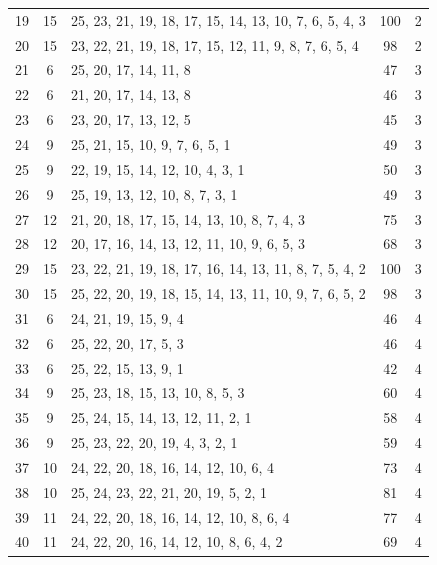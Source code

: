 {\begin{longtable}{cclcc}
   19 & 15 & 25, 23, 21, 19, 18, 17, 15, 14, 13, 10, 7, 6, 5, 4, 3  & 100 & 2 \\
   20 & 15 & 23, 22, 21, 19, 18, 17, 15, 12, 11, 9, 8, 7, 6, 5, 4   & 98  & 2 \\
   21 & 6  & 25, 20, 17, 14, 11, 8                                  & 47  & 3 \\
   22 & 6  & 21, 20, 17, 14, 13, 8                                  & 46  & 3 \\
   23 & 6  & 23, 20, 17, 13, 12, 5                                  & 45  & 3 \\
   24 & 9  & 25, 21, 15, 10, 9, 7, 6, 5, 1                          & 49  & 3 \\
   25 & 9  & 22, 19, 15, 14, 12, 10, 4, 3, 1                        & 50  & 3 \\
   26 & 9  & 25, 19, 13, 12, 10, 8, 7, 3, 1                         & 49  & 3 \\
   27 & 12 & 21, 20, 18, 17, 15, 14, 13, 10, 8, 7, 4, 3             & 75  & 3 \\
   28 & 12 & 20, 17, 16, 14, 13, 12, 11, 10, 9, 6, 5, 3             & 68  & 3 \\
   29 & 15 & 23, 22, 21, 19, 18, 17, 16, 14, 13, 11, 8, 7, 5, 4, 2  & 100 & 3 \\
   30 & 15 & 25, 22, 20, 19, 18, 15, 14, 13, 11, 10, 9, 7, 6, 5, 2  & 98  & 3 \\
   31 & 6  & 24, 21, 19, 15, 9, 4                                   & 46  & 4 \\
   32 & 6  & 25, 22, 20, 17, 5, 3                                   & 46  & 4 \\
   33 & 6  & 25, 22, 15, 13, 9, 1                                   & 42  & 4 \\
   34 & 9  & 25, 23, 18, 15, 13, 10, 8, 5, 3                        & 60  & 4 \\
   35 & 9  & 25, 24, 15, 14, 13, 12, 11, 2, 1                       & 58  & 4 \\
   36 & 9  & 25, 23, 22, 20, 19, 4, 3, 2, 1                         & 59  & 4 \\
   37 & 10 & 24, 22, 20, 18, 16, 14, 12, 10, 6, 4                   & 73  & 4 \\
   38 & 10 & 25, 24, 23, 22, 21, 20, 19, 5, 2, 1                    & 81  & 4 \\
   39 & 11 & 24, 22, 20, 18, 16, 14, 12, 10, 8, 6, 4                & 77  & 4 \\
   40 & 11 & 24, 22, 20, 16, 14, 12, 10, 8, 6, 4, 2                 & 69  & 4 \\
\end{longtable}
}
